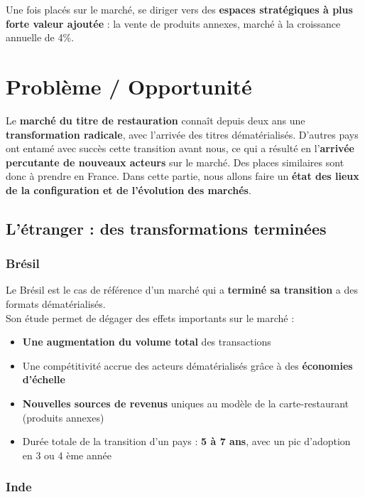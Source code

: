 Une fois placés sur le marché, se diriger vers des \textbf{espaces stratégiques
à plus forte valeur ajoutée} : la vente de produits annexes, marché à la
croissance annuelle de 4\%.  \\

\section{Problème / Opportunité}

Le \textbf{marché du titre de restauration} connaît depuis deux ans une
\textbf{transformation radicale}, avec l’arrivée des titres dématérialisés.
D’autres pays ont entamé avec succès cette transition avant nous, ce qui a
résulté en l’\textbf{arrivée percutante de nouveaux acteurs} sur le marché. Des
places similaires sont donc à prendre en France. Dans cette partie, nous allons
faire un \textbf{état des lieux de la configuration et de l’évolution des
marchés}. \\

\subsection{L’étranger : des transformations terminées}

\subsubsection{Brésil}

Le Brésil est le cas de référence d’un marché qui a \textbf{terminé sa
transition} a des formats dématérialisés. \\

Son étude permet de dégager des effets importants sur le marché : \\
\begin{itemize}
  \item \textbf{Une augmentation du volume total} des transactions
  \item Une compétitivité accrue des acteurs dématérialisés grâce à des
    \textbf{économies d’échelle}
  \item \textbf{Nouvelles sources de revenus} uniques au modèle de la
    carte-restaurant (produits annexes)
  \item Durée totale de la transition d’un pays : \textbf{5 à 7 ans}, avec un
    pic d’adoption en 3 ou 4 ème année
\end{itemize}

\subsubsection{Inde}

